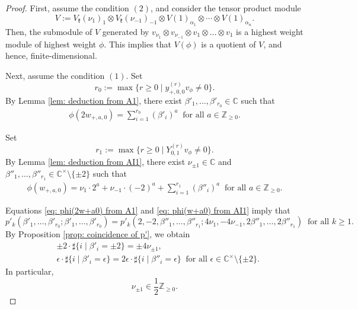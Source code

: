 \documentclass[12pt,a4paper]{amsart}
\theoremstyle{definition}
\numberwithin{equation}{subsection}
\begin{document}
\begin{proof}
  First, assume the condition $(2)$, and consider the tensor product module
  \[
    V := V_\mathfrak{k}(\nu_1)_1 \otimes V_\mathfrak{k}(\nu_{-1})_{-1} \otimes V(1)_{\alpha_1} \otimes \cdots \otimes V(1)_{\alpha_n}.
  \]
  Then, the submodule of $V$ generated by $v_{\nu_1} \otimes v_{\nu_{-1}} \otimes v_1 \otimes \dots \otimes v_1$ is a highest weight module of highest weight $\phi$.
  This implies that $V(\phi)$ is a quotient of $V$, and hence, finite-dimensional.

  Next, assume the condition $(1)$.
  Set
  \[
    r_0 := \max\{ r \geq 0 \mid y_{+,0,0}^{(r)} v_\phi \neq 0 \}.
  \]
  By Lemma \ref{lem: deduction from A1}, there exist $\beta'_1,\dots,\beta'_{r_0} \in \mathbb{C}$ such that
  \begin{align}\label{eq: phi(2w+a0) from A1}
    \phi(2w_{+,a,0}) = \sum_{i=1}^{r_0} (\beta'_i)^a \ \text{ for all } a \in \mathbb{Z}_{\geq 0}.
  \end{align}

  Set
  \[
    r_1 := \max\{ r \geq 0 \mid Y_{0,1}^{(r)} v_\phi \neq 0 \}.
  \]
  By Lemma \ref{lem: deduction from AI1}, there exist $\nu_{\pm 1} \in \mathbb{C}$ and $\beta''_1,\dots,\beta''_{r_1} \in \mathbb{C}^\times \setminus \{ \pm 2 \}$ such that
  \begin{align}\label{eq: phi(w+a0) from AI1}
    \phi(w_{+,a,0}) = \nu_1 \cdot 2^a + \nu_{-1} \cdot (-2)^a + \sum_{i=1}^{r_1} (\beta''_i)^a \ \text{ for all } a \in \mathbb{Z}_{\geq 0}.
  \end{align}

  Equations \eqref{eq: phi(2w+a0) from A1} and \eqref{eq: phi(w+a0) from AI1} imply that
  \[
    p'_k(\beta'_1,\dots,\beta'_{r_0};\beta'_1,\dots,\beta'_{r_0}) = p'_k(2,-2,\beta''_1,\dots,\beta''_{r_1};4\nu_1,-4\nu_{-1},2\beta''_1,\dots,2\beta''_{r_1}) \ \text{ for all } k \geq 1.
  \]
  By Proposition \ref{prop: coincidence of p'}, we obtain
  \begin{align*}
    &\pm 2 \cdot \sharp\{ i \mid \beta'_i = \pm 2 \} = \pm 4\nu_{\pm 1},\\
    &\epsilon \cdot \sharp\{ i \mid \beta'_i = \epsilon \} = 2\epsilon \cdot \sharp\{ i \mid \beta''_i = \epsilon \} \ \text{ for all } \epsilon \in \mathbb{C}^\times \setminus \{ \pm 2 \}.
  \end{align*}
  In particular,
  \[
    \nu_{\pm 1} \in \frac{1}{2}\mathbb{Z}_{\geq 0}.
  \]


\end{proof}
\end{document}

